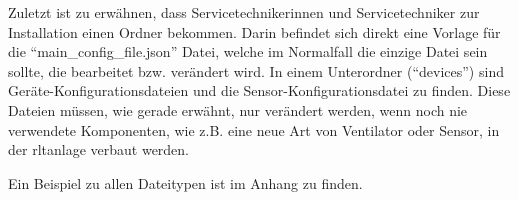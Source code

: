 Zuletzt ist zu erwähnen, dass Servicetechnikerinnen und Servicetechniker zur Installation einen Ordner bekommen. Darin befindet sich direkt eine Vorlage für die \enquote{main\_config\_file.json} Datei, welche im Normalfall die einzige Datei sein sollte, die bearbeitet bzw. verändert wird.
In einem Unterordner (\enquote{devices}) sind Geräte-Konfigurationsdateien und die Sensor-Konfigurationsdatei zu finden. Diese Dateien müssen, wie gerade erwähnt, nur verändert werden, wenn noch nie verwendete Komponenten, wie z.B. eine neue Art von Ventilator oder Sensor, in der \acs{rltanlage} verbaut werden.

Ein Beispiel zu allen Dateitypen ist im Anhang zu finden.




